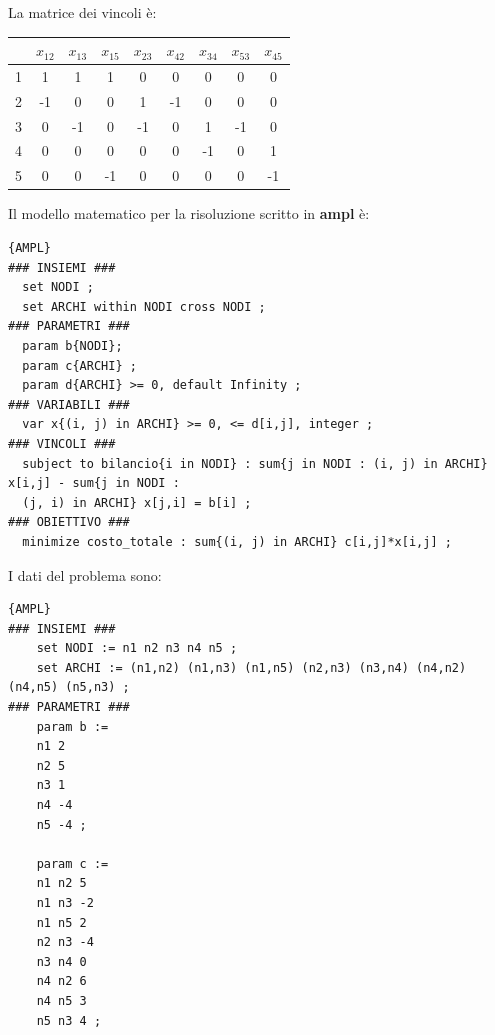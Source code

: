 La matrice dei vincoli è:
\begin{table}
	\begin{adjustbox}{width=0.4\columnwidth,center}
		\begin{tabular}{|c|c|c|c|c|c|c|c|c|}
			\hline
			  & $x_{12}$ & $x_{13}$ & $x_{15}$ & $x_{23}$ & $x_{42}$ & $x_{34}$ & $x_{53}$ & $x_{45}$ \\
			\hline
			1 & 1        & 1        & 1        & 0        & 0        & 0        & 0        & 0        \\
			2 & -1       & 0        & 0        & 1        & -1       & 0        & 0        & 0        \\
			3 & 0        & -1       & 0        & -1       & 0        & 1        & -1       & 0        \\
			4 & 0        & 0        & 0        & 0        & 0        & -1       & 0        & 1        \\
			5 & 0        & 0        & -1       & 0        & 0        & 0        & 0        & -1       \\
			\hline
		\end{tabular}
	\end{adjustbox}
\end{table}

Il modello matematico per la risoluzione scritto in \textbf{ampl} è:

\begin{adjustbox}{width=0.8\columnwidth,center}
	\begin{lstlisting}{AMPL}
### INSIEMI ###
  set NODI ;
  set ARCHI within NODI cross NODI ;
### PARAMETRI ###
  param b{NODI};
  param c{ARCHI} ;
  param d{ARCHI} >= 0, default Infinity ;
### VARIABILI ###
  var x{(i, j) in ARCHI} >= 0, <= d[i,j], integer ;
### VINCOLI ###
  subject to bilancio{i in NODI} : sum{j in NODI : (i, j) in ARCHI} x[i,j] - sum{j in NODI :
  (j, i) in ARCHI} x[j,i] = b[i] ;
### OBIETTIVO ###
  minimize costo_totale : sum{(i, j) in ARCHI} c[i,j]*x[i,j] ;
  \end{lstlisting}
\end{adjustbox}


I dati del problema sono:

\begin{adjustbox}{width=0.8\columnwidth,center}
	\begin{lstlisting}{AMPL}
### INSIEMI ###
    set NODI := n1 n2 n3 n4 n5 ;
    set ARCHI := (n1,n2) (n1,n3) (n1,n5) (n2,n3) (n3,n4) (n4,n2) (n4,n5) (n5,n3) ;
### PARAMETRI ###
    param b :=
    n1 2
    n2 5
    n3 1
    n4 -4
    n5 -4 ;

    param c :=
    n1 n2 5
    n1 n3 -2
    n1 n5 2
    n2 n3 -4
    n3 n4 0
    n4 n2 6
    n4 n5 3
    n5 n3 4 ;
  \end{lstlisting}
\end{adjustbox}




